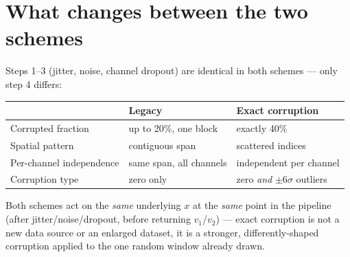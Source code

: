 \documentclass[10pt,a4paper]{article}
\begin{document}
\section{What changes between the two schemes}
Steps 1--3 (jitter, noise, channel dropout) are identical in both schemes — only
step 4 differs:

\begin{center}
\begin{tabular}{@{}lll@{}}
\toprule
& \textbf{Legacy} & \textbf{Exact corruption} \\
\midrule
Corrupted fraction & up to 20\%, one block & exactly 40\% \\
Spatial pattern & contiguous span & scattered indices \\
Per-channel independence & same span, all channels & independent per channel \\
Corruption type & zero only & zero \emph{and} $\pm6\sigma$ outliers \\
\bottomrule
\end{tabular}
\end{center}

Both schemes act on the \emph{same} underlying $x$ at the \emph{same} point in the
pipeline (after jitter/noise/dropout, before returning $v_1$/$v_2$) — exact
corruption is not a new data source or an enlarged dataset, it is a stronger,
differently-shaped corruption applied to the one random window already drawn.
\end{document}
